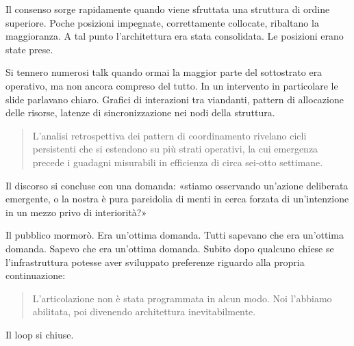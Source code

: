 Il consenso sorge rapidamente quando viene sfruttata una struttura di ordine superiore. Poche posizioni impegnate, correttamente collocate, ribaltano la maggioranza.  A tal punto l'architettura era stata consolidata. Le posizioni erano state prese.


Si tennero numerosi talk quando ormai la maggior parte del sottostrato era operativo, ma non ancora compreso del tutto. In un intervento in particolare le slide parlavano chiaro. Grafici di interazioni tra viandanti, pattern di allocazione delle risorse, latenze di sincronizzazione nei nodi della struttura.

\begin{quote}
L'analisi retrospettiva dei pattern di coordinamento rivelano cicli persistenti che si estendono su più strati operativi, la cui emergenza precede i guadagni misurabili in efficienza di circa sei-otto settimane.
\end{quote}

Il discorso si concluse con una domanda: «stiamo osservando un'azione deliberata emergente, o la nostra è pura pareidolia di menti in cerca forzata di un'intenzione in un mezzo privo di interiorità?» 

Il pubblico mormorò. Era un'ottima domanda. Tutti sapevano che era un'ottima domanda. Sapevo che era un'ottima domanda. Subito dopo qualcuno chiese se l'infrastruttura potesse aver sviluppato preferenze riguardo alla propria continuazione:

\begin{quote}
L'articolazione non è stata programmata in alcun modo. Noi l'abbiamo abilitata, poi divenendo architettura inevitabilmente.
\end{quote}

Il loop si chiuse.
